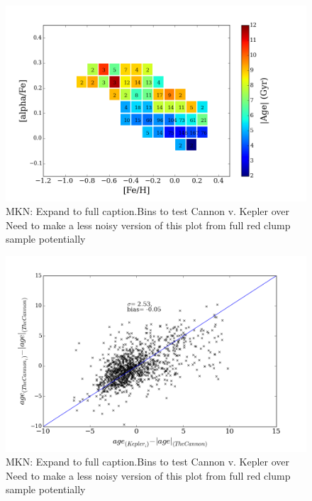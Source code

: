 \documentclass[12pt, preprint]{aastex}
\begin{document}
\begin{figure}[p!]
\centering
    \includegraphics[scale=0.31]{./plots/alpha_feh_bins.png}
    \caption{MKN: Expand to full caption.Bins to test Cannon v. Kepler over  Need to make a less noisy version of this plot from full red clump sample potentially  }
\label{fig:alphabins}
\end{figure}

\begin{figure}[p!]
\centering
    \includegraphics[scale=0.31]{./plots/delta_age_2.png}
    \caption{MKN: Expand to full caption.Bins to test Cannon v. Kepler over  Need to make a less noisy version of this plot from full red clump sample potentially  }
\label{fig:alphabins}
\end{figure}
\end{document}
